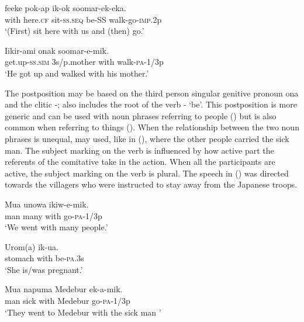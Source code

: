 \ea%
\label{ex:x822}
\gll {} feeke pok-ap ik-ok soomar-ek-eka. \\
with here.\textsc{cf} sit-\textsc{ss}.\textsc{seq} be-SS walk-go-\textsc{imp}.2p\\
\glt`(First) sit here with us and (then) go.'
\z

\ea%
\label{ex:x1817}
\gll Iikir-ami onak  soomar-e-mik. \\
get.up-\textsc{ss}.\textsc{sim} 3s/p.mother with walk-\textsc{pa}-1/3p\\
\glt`He got up and walked with his mother.'
\z

The postposition  may be based on the third person singular genitive pronoun ona and the clitic -;  also includes the root of the verb \nobreakdash- `be'. This postposition is more generic and can be used with noun phrases referring to people () but is also common when referring to things (). When the relationship between the two noun phrases is unequal,  may used, like in (), where the other people carried the sick man. The subject marking on the verb is influenced by how active part the referents of the comitative  take in the action. When all the participants are active, the subject marking on the verb is plural. The speech in () was directed towards the villagers who were instructed to stay away from the Japanese troops. 

\ea%
\label{ex:x754}
\gll Mua unowa  ikiw-e-mik. \\
man many with go-\textsc{pa}-1/3p\\
\glt`We went with many people.'
\z

\ea%
\label{ex:x755}
\gll Urom(a)  ik-ua. \\
stomach with be-\textsc{pa}.3s\\
\glt`She is/was pregnant.'
\z

\ea%
\label{ex:x823}
\gll Mua napuma  Medebur ek-a-mik. \\
man sick with Medebur go-\textsc{pa}-1/3p\\
\glt`They went to Medebur with the sick man '
\z

